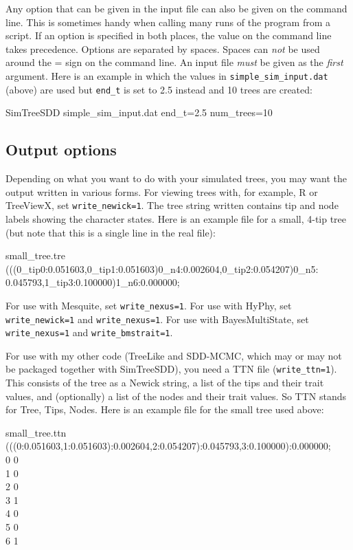\documentclass[10pt]{article}
\begin{document}
Any option that can be given in the input file can also be given on the command line.  This is sometimes handy when calling many runs of the program from a script.
If an option is specified in both places, the value on the command line takes precedence.  Options are separated by spaces.  Spaces can {\em not} be used around the = sign on the command line.  An input file {\em must} be given as the {\em first} argument.  Here is an example in which the values in \texttt{simple\_sim\_input.dat} (above) are used but \texttt{end\_t} is set to 2.5 instead and 10 trees are created:
\begin{commandis}
	SimTreeSDD simple\_sim\_input.dat end\_t=2.5 num\_trees=10
\end{commandis}


\subsection*{Output options}

Depending on what you want to do with your simulated trees, you may want the output written in various forms.  
For viewing trees with, for example, R or TreeViewX, set \texttt{write\_newick=1}.  The tree string written contains tip and node labels showing the character states.  Here is an example file for a small, 4-tip tree (but note that this is a single line in the real file):
\begin{filesays}{small\_tree.tre}
(((0\_tip0:0.051603,0\_tip1:0.051603)0\_n4:0.002604,0\_tip2:0.054207)0\_n5:\\0.045793,1\_tip3:0.100000)1\_n6:0.000000;
\end{filesays}

For use with Mesquite, set \texttt{write\_nexus=1}.  For use with HyPhy, set \texttt{write\_newick=1} and \texttt{write\_nexus=1}.  For use with BayesMultiState, set \texttt{write\_nexus=1} and \texttt{write\_bmstrait=1}.

For use with my other code (TreeLike and SDD-MCMC, which may or may not be packaged together with SimTreeSDD), you need a TTN file (\texttt{write\_ttn=1}).  This consists of the tree as a Newick string, a list of the tips and their trait values, and (optionally) a list of the nodes and their trait values.  So TTN stands for Tree, Tips, Nodes.  Here is an example file for the small tree used above:
\begin{filesays}{small\_tree.ttn}
(((0:0.051603,1:0.051603):0.002604,2:0.054207):0.045793,3:0.100000):0.000000; \\
0    0	\\
1    0	\\
2    0	\\
3    1	\\
4    0	\\
5    0	\\
6    1
\end{filesays}
\end{document}
